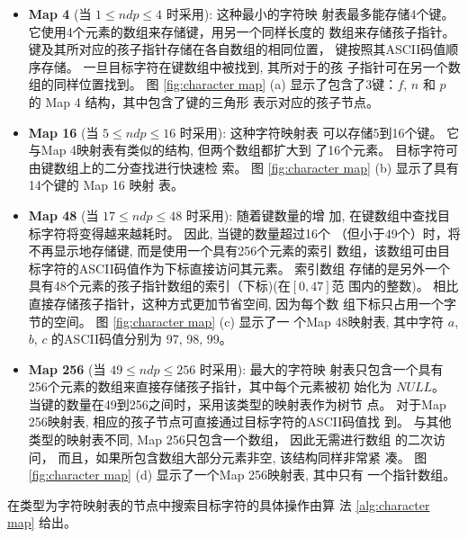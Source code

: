 \begin{itemize}
\item \textbf{Map 4} (当 $1 \leq ndp \leq 4$ 时采用): 这种最小的字符映
  射表最多能存储4个键。 它使用4个元素的数组来存储键，用另一个同样长度的
  数组来存储孩子指针。 键及其所对应的孩子指针存储在各自数组的相同位置，
  键按照其ASCII码值顺序存储。 一旦目标字符在键数组中被找到, 其所对于的孩
  子指针可在另一个数组的同样位置找到。  图 \ref{fig:character map} (a)
  显示了包含了3键：$f$, $n$ 和 $p$ 的 Map 4 结构，其中包含了键的三角形
  表示对应的孩子节点。

\item \textbf{Map 16} (当 $5 \leq ndp \leq 16$ 时采用): 这种字符映射表
  可以存储5到16个键。 它与Map 4映射表有类似的结构, 但两个数组都扩大到
  了16个元素。 目标字符可由键数组上的二分查找进行快速检
  索。 图 \ref{fig:character map} (b) 显示了具有14个键的 Map 16 映射
  表。


\item \textbf{Map 48} (当 $17 \leq ndp \leq 48$ 时采用): 随着键数量的增
  加, 在键数组中查找目标字符将变得越来越耗时。 因此, 当键的数量超过16个
  （但小于49个）时，将不再显示地存储键, 而是使用一个具有256个元素的索引
  数组，该数组可由目标字符的ASCII码值作为下标直接访问其元素。 索引数组
  存储的是另外一个具有48个元素的孩子指针数组的索引（下标)(在$[0,47]$范
  围内的整数)。 相比直接存储孩子指针，这种方式更加节省空间, 因为每个数
  组下标只占用一个字节的空间。 图 \ref{fig:character map} (c) 显示了一
  个Map 48映射表, 其中字符 $a$, $b$, $c$ 的ASCII码值分别为 97, 98, 99。

\item \textbf{Map 256} (当 $49 \leq ndp \leq 256$ 时采用): 最大的字符映
  射表只包含一个具有256个元素的数组来直接存储孩子指针，其中每个元素被初
  始化为 $NULL$。 当键的数量在49到256之间时，采用该类型的映射表作为树节
  点。 对于Map 256映射表, 相应的孩子节点可直接通过目标字符的ASCII码值找
  到。 与其他类型的映射表不同, Map 256只包含一个数组， 因此无需进行数组
  的二次访问， 而且，如果所包含数组大部分元素非空, 该结构同样非常紧
  凑。 图 \ref{fig:character map} (d) 显示了一个Map 256映射表, 其中只有
  一个指针数组。
\end{itemize}

在类型为字符映射表的节点中搜索目标字符的具体操作由算
法 \ref{alg:character map} 给出。

